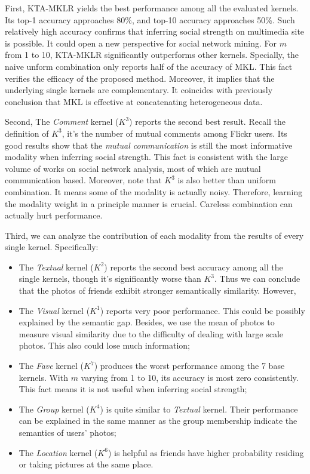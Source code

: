 First, KTA-MKLR yields the best performance among all the evaluated kernels. Its top-1 accuracy approaches 80\%, and top-10 accuracy approaches 50\%. Such relatively high accuracy confirms that inferring social strength on multimedia site is possible. It could open a new perspective for social network mining. For $m$ from 1 to 10, KTA-MKLR significantly outperforms other kernels. Specially, the naive unform combination only reports half of the accuracy of  MKL. This fact
verifies the efficacy of the proposed method. Moreover, it implies that the underlying single kernels are complementary. It coincides with previously conclusion
that MKL is effective at concatenating heterogeneous data.

Second, The {\em Comment} kernel ($K^3$) reports the second best result. Recall the definition of $K^3$, it's the number of mutual comments among Flickr users.
Its good results show that the {\em mutual communication} is still the most informative modality when inferring social strength. This fact is consistent with
the large volume of works on social network analysis, most of which are mutual communication based. Moreover, note that $K^3$ is also better than uniform
combination. It means some of the modality is actually noisy. Therefore, learning the modality weight in a principle manner is crucial. Careless combination can
actually hurt performance.

Third, we can analyze the contribution of each modality from the results of every single kernel. Specifically:
\begin{itemize}
  \item The {\em Textual} kernel ($K^2$) reports the second best accuracy among all the single kernels, though it's significantly worse than $K^3$. Thus we
can conclude that the photos of friends exhibit stronger semantically similarity. However,
  \item The {\em Visual} kernel ($K^1$) reports very poor performance. This could be possibly explained by the semantic gap. Besides, we use the mean of
photos to measure visual similarity due to the difficulty of dealing with large scale photos. This also could lose much information;
  \item The {\em Fave} kernel ($K^7$) produces the worst performance among the 7 base kernels. With $m$ varying from 1 to 10, its accuracy is most zero
consistently. This fact means it is not useful when inferring social strength;
  \item The {\em Group} kernel ($K^4$) is quite similar to {\em Textual} kernel. Their performance can be explained in the same manner as the group
membership indicate the semantics of users' photos;
  \item The {\em Location} kernel ($K^6$) is helpful as friends have higher probability residing or taking pictures at the same place.
\end{itemize}

